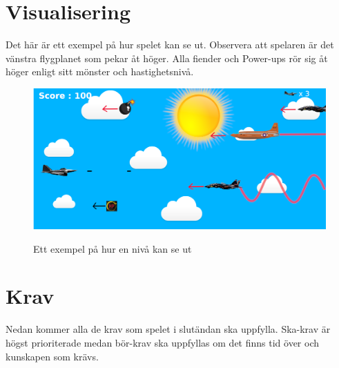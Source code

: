 \documentclass{TDP005mall}
\begin{document}
\section{Visualisering}
Det här är ett exempel på hur spelet kan se ut. Observera att spelaren är det vänstra flygplanet som pekar åt höger. Alla fiender och Power-ups rör sig åt höger enligt sitt mönster och hastighetsnivå. 

\begin{figure}[h!]
  \centering
  \includegraphics[scale=0.35]{Images/Game.png}
  \label{}
  \caption{Ett exempel på hur en nivå kan se ut}
\end{figure}


\section{Krav}
Nedan kommer alla de krav som spelet i slutändan ska uppfylla. Ska-krav är högst prioriterade medan bör-krav ska uppfyllas om det finns tid över och kunskapen som krävs.
\end{document}
